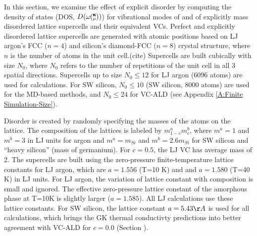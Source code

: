 \documentclass[aps,prb,twocolumn,superscriptaddress,amsmath,amssymb,floatfix]{revtex4}
\newcommand{\kv}{\mspace{-4.0mu}\left(\mspace{-8.0mu}
\begin{smallmatrix}&\pmb{\kappa} \\&\nu\end{smallmatrix}
\mspace{-3.0mu}\right)}
\begin{document}
In this section, we examine the effect of explicit disorder by computing 
the density of states (DOS, $D(\omega\kv)$) for vibrational modes of  
and of explicitly mass disordered lattice supercells and their 
equivalent VCs. 
Perfect and explicitly disordered lattice supercells are generated 
with atomic positions 
based on LJ argon's FCC ($n=4$) and silicon's diamond-FCC ($n=8$) 
crystal structure, where $n$ is the number of atoms 
in the unit cell.(cite)  
Supercells are built cubically with size $N_0$, where $N_0$ refers to the 
number of repetitions of the unit cell in all 3 
spatial directions. Supercells up to size $N_0 \le 12$ 
for LJ argon (6096 atoms) are used for calculations. For SW silicon, 
$N_0 \le 10$ (SW silicon, 8000 atoms) are used for 
the MD-based methods, and $N_0 \le 24$ for VC-ALD 
(see Appendix \ref{A:Finite Simulation-Size}).  

Disorder is created by randomly specifying the masses of the atoms 
on the lattice. 
The composition of the lattices is labeled by $m^a_{1-c}m^b_{c}$,  
where $m^a=1$ and $m^b=3$ in 
LJ units for argon and $m^a=m_{Si}$ and $m^b=2.6m_{Si}$ 
for SW silicon and ``heavy silicon'' (mass of germanium). 
For $c=0.5$, the LJ VC has average mass of 2. 
The supercells are built using 
the zero-pressure finite-temperature lattice constants 
for LJ argon, which are $a=1.556$ (T=10 K) and 
and $a=1.580$ (T=40 K) in LJ units.\cite{mcgaughey_phonon_2004} 
For LJ argon, the variation of lattice constant 
with composition is small and ignored. 
The effective zero-pressure lattice constant 
of the amorphous phase at T=10K is slightly larger 
($a = 1.585$).\cite{mcgaughey_phonon_2004}  
All LJ calculations use these lattice constants. 
For SW silicon, the lattice constant $a=5.43 \AA$ is used 
for all calculations, which brings the GK thermal conductivty 
predictions\cite{goicochea_thermal_2010} 
into better agreement with VC-ALD
\cite{sellan_cross-plane_2010} for $c=0.0$ (Section ).
\end{document}
